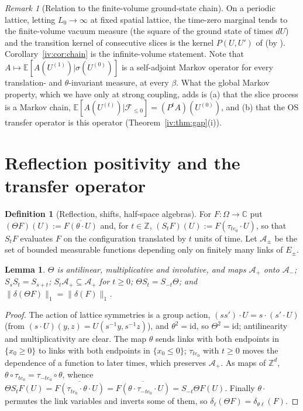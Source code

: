 \documentclass[11pt,a4paper]{article}
\newtheorem{lemma}[theorem]{Lemma}
\theoremstyle{definition}
\newtheorem{definition}[theorem]{Definition}
\theoremstyle{remark}
\newtheorem{remark}[theorem]{Remark}
\newcommand{\C}{\mathbb{C}}
\newcommand{\Z}{\mathbb{Z}}
\newcommand{\E}{\mathbb{E}}
\newcommand{\cA}{\mathcal{A}}
\newcommand{\cF}{\mathcal{F}}
\newcommand{\norm}[1]{\lVert #1\rVert}
\newcommand{\Fref}[3]{\cite[#1~`#2' (\texttt{#3})]{F}}
\newcommand{\Flab}[2]{\cite[#1 \texttt{#2}]{F}}
\begin{document}
\begin{remark}[Relation to the finite-volume ground-state chain]
On a periodic lattice, letting $L_0\to\infty$ at fixed spatial lattice, the time-zero marginal tends to the finite-volume vacuum
measure (the square of the ground state of \Fref{Theorem}{Vacuum}{thm:vacuum} times $dU$) and the transition kernel of consecutive
slices is the kernel $P(U,U')$ of \Fref{Theorem}{Exact reformulation of the gap}{thm:chain} (by \Flab{Theorem}{thm:gs}).
Corollary~\ref{iv:cor:chain} is the infinite-volume statement. Note that $A\mapsto\E[A(U^{(1)})|\sigma(U^{(0)})]$ is a self-adjoint Markov
operator for every translation- and $\theta$-invariant measure, at every $\beta$. What the global Markov property, which we have only at
strong coupling, adds is (a) that the slice process is a Markov chain, $\E[A(U^{(t)})|\cF_{\le0}]=(P^tA)(U^{(0)})$, and (b) that the OS
transfer operator is this operator (Theorem~\ref{iv:thm:gap}(i)).
\end{remark}

\section{Reflection positivity and the transfer operator}\label{iv:sec:OS}

\begin{definition}[Reflection, shifts, half-space algebras]\label{iv:def:reflection}
For $F:\Omega\to\C$ put $(\Theta F)(U):=\overline{F(\theta\cdot U)}$ and, for $t\in\Z$, $(S_tF)(U):=F(\tau_{te_0}\cdot U)$, so that
$S_tF$ evaluates $F$ on the configuration translated by $t$ units of time. Let $\cA_\pm$ be the set of bounded measurable functions
depending only on finitely many links of $E_\pm$.
\end{definition}

\begin{lemma}\label{iv:lem:reflection}
$\Theta$ is antilinear, multiplicative and involutive, and maps $\cA_+$ onto $\cA_-$; $S_s S_t=S_{s+t}$; $S_t\cA_+\subseteq\cA_+$ for
$t\ge0$; $\Theta S_t=S_{-t}\Theta$; and $\norm{\delta(\Theta F)}_1=\norm{\delta(F)}_1$.
\end{lemma}

\begin{proof}
The action of lattice symmetries is a group action, $(ss')\cdot U=s\cdot(s'\cdot U)$ (from $(s\cdot U)(y,z)=U(s^{-1}y,s^{-1}z)$), and
$\theta^2=\mathrm{id}$, so $\Theta^2=\mathrm{id}$; antilinearity and multiplicativity are clear. The map $\theta$ sends links with both
endpoints in $\{x_0\ge0\}$ to links with both endpoints in $\{x_0\le0\}$; $\tau_{te_0}$ with $t\ge0$ moves the dependence of a function
to later times, which preserves $\cA_+$. As maps of $\Z^d$, $\theta\circ\tau_{te_0}=\tau_{-te_0}\circ\theta$, whence
$\Theta S_tF(U)=\overline{F(\tau_{te_0}\cdot\theta\cdot U)}=\overline{F(\theta\cdot\tau_{-te_0}\cdot U)}=S_{-t}\Theta F(U)$. Finally
$\theta\cdot$ permutes the link variables and inverts some of them, so $\delta_{\ell}(\Theta F)=\delta_{\theta\ell}(F)$.
\end{proof}
\end{document}
